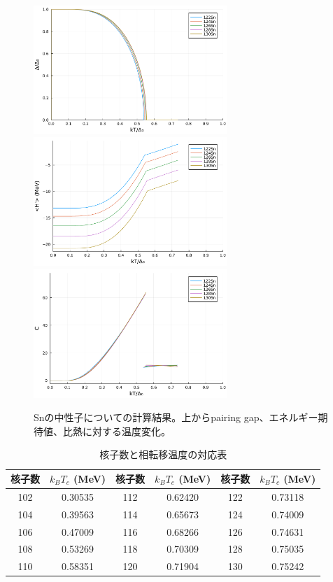 \documentclass[a4paper]{jsreport}
\begin{document}
  \begin{figure}[H]
    \centering
    \includegraphics[width=0.65\textwidth]{main_fig/122d.pdf}
    \includegraphics[width=0.65\textwidth]{main_fig/122H.pdf}
    \includegraphics[width=0.65\textwidth]{main_fig/122C.pdf}
    \caption{Snの中性子についての計算結果。上からpairing gap、エネルギー期待値、比熱に対する温度変化。}
  \end{figure}
  \begin{table}[H]
    \centering
    \caption{核子数と相転移温度の対応表}
    \label{tab:transition_temperature}
    \begin{tabular}{cccccc}
        \toprule
        核子数 & $k_B T_c$ (MeV) & 核子数 & $k_B T_c$ (MeV) & 核子数 & $k_B T_c$ (MeV) \\
        \midrule
        102 & 0.30535 & 112 & 0.62420 & 122 & 0.73118 \\
        104 & 0.39563 & 114 & 0.65673 & 124 & 0.74009 \\
        106 & 0.47009 & 116 & 0.68266 & 126 & 0.74631 \\
        108 & 0.53269 & 118 & 0.70309 & 128 & 0.75035 \\
        110 & 0.58351 & 120 & 0.71904 & 130 & 0.75242 \\
        \bottomrule
    \end{tabular}
  \end{table}
\end{document}
